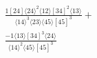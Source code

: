 \documentclass[varwidth, border=5pt]{standalone}
\begin{document}
\begin{my}
$\begin{gathered}
\scriptscriptstyle\frac{1[24]⟨24⟩^2⟨12⟩[34]^2⟨13⟩}{⟨14⟩^3⟨23⟩⟨45⟩[45]^3}+\\
\scriptscriptstyle\frac{-1⟨13⟩[34]^3⟨24⟩}{⟨14⟩^2⟨45⟩[45]^3}\phantom{+}
\end{gathered}$
\end{my}
\end{document}
